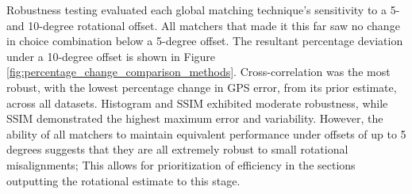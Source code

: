 Robustness testing evaluated each global matching technique's sensitivity to a 5- and 10-degree rotational offset. All matchers that made it this far saw no change in choice combination below a 5-degree offset. The resultant percentage deviation under a 10-degree offset is shown in Figure \ref{fig:percentage_change_comparison_methods}. 
Cross-correlation was the most robust, with the lowest percentage change in GPS error, from its prior estimate, across all datasets. Histogram and SSIM exhibited moderate robustness, while SSIM demonstrated the highest maximum error and variability. However, the ability of all matchers to maintain equivalent performance under offsets of up to 5 degrees suggests that they are all extremely robust to small rotational misalignments; This allows for prioritization of efficiency in the sections outputting the rotational estimate to this stage.

